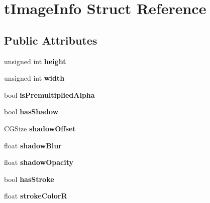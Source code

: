 \hypertarget{structtImageInfo}{}\section{t\+Image\+Info Struct Reference}
\label{structtImageInfo}
\subsection*{Public Attributes}
\begin{DoxyCompactItemize}
\item 
\mbox{\label{structtImageInfo_a4614ca165a986f6bc136567c7daba455}} 
unsigned int {\bfseries height}
\item 
\mbox{\label{structtImageInfo_a47297190ee829befdda409c3b49e1522}} 
unsigned int {\bfseries width}
\item 
\mbox{\label{structtImageInfo_ac4845bbb4f678cb7ab5b284ab2b9dc45}} 
bool {\bfseries is\+Premultiplied\+Alpha}
\item 
\mbox{\label{structtImageInfo_a0385a4fe8385e051d7d14174ab5b5346}} 
bool {\bfseries has\+Shadow}
\item 
\mbox{\label{structtImageInfo_a8e4942ef1eaf0c6fdba23e172a08e789}} 
C\+G\+Size {\bfseries shadow\+Offset}
\item 
\mbox{\label{structtImageInfo_a208bc8f71335d793e2a3864b6519bc7a}} 
float {\bfseries shadow\+Blur}
\item 
\mbox{\label{structtImageInfo_a023bb3ec58afc0e4912f503f0ba11c24}} 
float {\bfseries shadow\+Opacity}
\item 
\mbox{\label{structtImageInfo_afefba44821331754a5c01929911d69cd}} 
bool {\bfseries has\+Stroke}
\item 
\mbox{\label{structtImageInfo_ae00fb35a0682cbb1b6f149fa489249bb}} 
float {\bfseries stroke\+ColorR}
\item 
\mbox{\label{structtImageInfo_a1119379f638eeb069e7179be748e3b17}} 

\end{DoxyCompactItemize}
